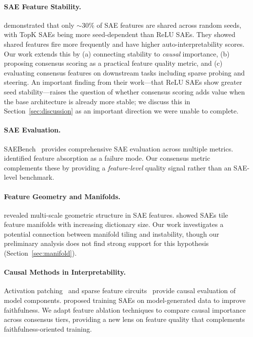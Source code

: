 \documentclass{article}
\begin{document}
\paragraph{SAE Feature Stability.}
\citet{paulo2025sparse} demonstrated that only $\sim$30\% of SAE features are shared across random seeds, with TopK SAEs being more seed-dependent than ReLU SAEs. They showed shared features fire more frequently and have higher auto-interpretability scores. Our work extends this by (a) connecting stability to \emph{causal} importance, (b) proposing consensus scoring as a practical feature quality metric, and (c) evaluating consensus features on downstream tasks including sparse probing and steering. An important finding from their work---that ReLU SAEs show greater seed stability---raises the question of whether consensus scoring adds value when the base architecture is already more stable; we discuss this in Section~\ref{sec:discussion} as an important direction we were unable to complete.

\paragraph{SAE Evaluation.}
SAEBench~\citep{karvonen2025saebench} provides comprehensive SAE evaluation across multiple metrics. \citet{chanin2024absorption} identified feature absorption as a failure mode. Our consensus metric complements these by providing a \emph{feature-level} quality signal rather than an SAE-level benchmark.

\paragraph{Feature Geometry and Manifolds.}
\citet{li2025geometry} revealed multi-scale geometric structure in SAE features. \citet{michaud2025understanding} showed SAEs tile feature manifolds with increasing dictionary size. Our work investigates a potential connection between manifold tiling and instability, though our preliminary analysis does not find strong support for this hypothesis (Section~\ref{sec:manifold}).

\paragraph{Causal Methods in Interpretability.}
Activation patching~\citep{zhang2024towards} and sparse feature circuits~\citep{marks2024sparse} provide causal evaluation of model components. \citet{cho2025faithfulsae} proposed training SAEs on model-generated data to improve faithfulness. We adapt feature ablation techniques to compare causal importance across consensus tiers, providing a new lens on feature quality that complements faithfulness-oriented training.
\end{document}
